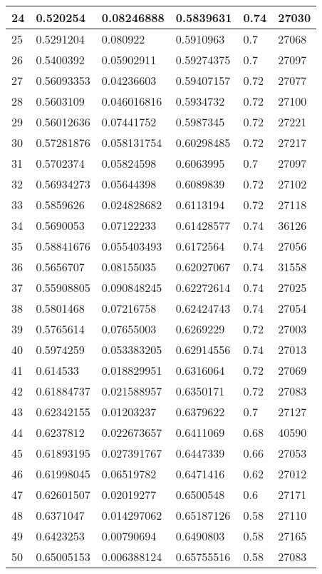\begin{longtable}{|l|l|l|l|l|l|}
24 & 0.520254 & 0.08246888 & 0.5839631 & 0.74 & 27030 \\ \hline 
25 & 0.5291204 & 0.080922 & 0.5910963 & 0.7 & 27068 \\ \hline 
26 & 0.5400392 & 0.05902911 & 0.59274375 & 0.7 & 27097 \\ \hline 
27 & 0.56093353 & 0.04236603 & 0.59407157 & 0.72 & 27077 \\ \hline 
28 & 0.5603109 & 0.046016816 & 0.5934732 & 0.72 & 27100 \\ \hline 
29 & 0.56012636 & 0.07441752 & 0.5987345 & 0.72 & 27221 \\ \hline 
30 & 0.57281876 & 0.058131754 & 0.60298485 & 0.72 & 27217 \\ \hline 
31 & 0.5702374 & 0.05824598 & 0.6063995 & 0.7 & 27097 \\ \hline 
32 & 0.56934273 & 0.05644398 & 0.6089839 & 0.72 & 27102 \\ \hline 
33 & 0.5859626 & 0.024828682 & 0.6113194 & 0.72 & 27118 \\ \hline 
34 & 0.5690053 & 0.07122233 & 0.61428577 & 0.74 & 36126 \\ \hline 
35 & 0.58841676 & 0.055403493 & 0.6172564 & 0.74 & 27056 \\ \hline 
36 & 0.5656707 & 0.08155035 & 0.62027067 & 0.74 & 31558 \\ \hline 
37 & 0.55908805 & 0.090848245 & 0.62272614 & 0.74 & 27025 \\ \hline 
38 & 0.5801468 & 0.07216758 & 0.62424743 & 0.74 & 27054 \\ \hline 
39 & 0.5765614 & 0.07655003 & 0.6269229 & 0.72 & 27003 \\ \hline 
40 & 0.5974259 & 0.053383205 & 0.62914556 & 0.74 & 27013 \\ \hline 
41 & 0.614533 & 0.018829951 & 0.6316064 & 0.72 & 27069 \\ \hline 
42 & 0.61884737 & 0.021588957 & 0.6350171 & 0.72 & 27083 \\ \hline 
43 & 0.62342155 & 0.01203237 & 0.6379622 & 0.7 & 27127 \\ \hline 
44 & 0.6237812 & 0.022673657 & 0.6411069 & 0.68 & 40590 \\ \hline 
45 & 0.61893195 & 0.027391767 & 0.6447339 & 0.66 & 27053 \\ \hline 
46 & 0.61998045 & 0.06519782 & 0.6471416 & 0.62 & 27012 \\ \hline 
47 & 0.62601507 & 0.02019277 & 0.6500548 & 0.6 & 27171 \\ \hline 
48 & 0.6371047 & 0.014297062 & 0.65187126 & 0.58 & 27110 \\ \hline 
49 & 0.6423253 & 0.00790694 & 0.6490803 & 0.58 & 27165 \\ \hline 
50 & 0.65005153 & 0.006388124 & 0.65755516 & 0.58 & 27083 \\ \hline 
\end{longtable}